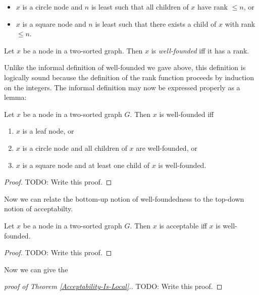 \documentclass[oneside,12pt]{amsart}
\begin{document}
\begin{itemize}
\item $x$ is a circle node and $n$ is least such that all children of $x$ have rank $\leq n$, or
\item $x$ is a square node and $n$ is least such that there exists a child of $x$ with rank $\leq n$.
\end{itemize}

\begin{definition}
Let $x$ be a node in a two-sorted graph. Then $x$ is \emph{well-founded} iff it has a rank.
\end{definition}

Unlike the informal definition of well-founded we gave above, this definition is logically sound because
the definition of the rank function proceeds by induction on the integers. The informal definition may now
be expressed properly as a lemma:

\begin{lemma}
Let $x$ be a node in a two-sorted graph $G$.  Then $x$ is well-founded iff
\begin{enumerate}
\item $x$ is a leaf node, or
\item $x$ is a circle node and all children of $x$ are well-founded, or
\item $x$ is a square node and at least one child of $x$ is well-founded.
\end{enumerate}
\end{lemma}
\begin{proof}
TODO: Write this proof.
\end{proof}

Now we can relate the bottom-up notion of well-foundedness to the top-down notion of acceptabilty.

\begin{theorem}
Let $x$ be a node in a two-sorted graph $G$. Then $x$ is acceptable iff $x$ is well-founded.
\end{theorem}
\begin{proof}
TODO: Write this proof.
\end{proof}


Now we can give the

\begin{proof}[proof of Theorem \ref{Acceptability-Is-Local}.]

TODO: Write this proof.

\end{proof}
\end{document}
